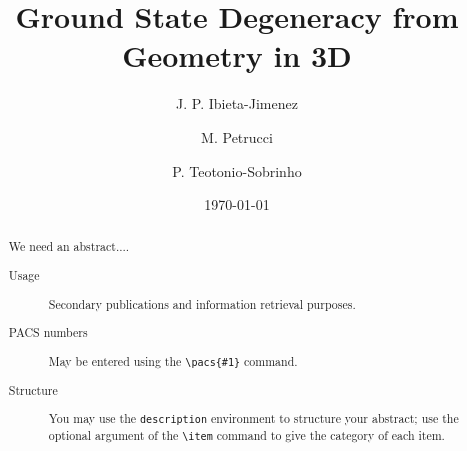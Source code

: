 \documentclass[%
nofootinbib,
 amsmath,amssymb,
aps,
]{revtex4-1}
\theoremstyle{plain}%
\theoremstyle{definition}
\theoremstyle{remark}
\begin{document}

\title{Ground State Degeneracy from Geometry in 3D}%

\author{J. P. Ibieta-Jimenez}

\author{M. Petrucci}%
\author{P. Teotonio-Sobrinho}%
%

\date{\today}%

\begin{abstract}
We need an abstract....
\begin{description}
\item[Usage]
Secondary publications and information retrieval purposes.
\item[PACS numbers]
May be entered using the \verb+\pacs{#1}+ command.
\item[Structure]
You may use the \texttt{description} environment to structure your abstract;
use the optional argument of the \verb+\item+ command to give the category of each item. 
\end{description}
\end{abstract}

\maketitle
\end{document}
